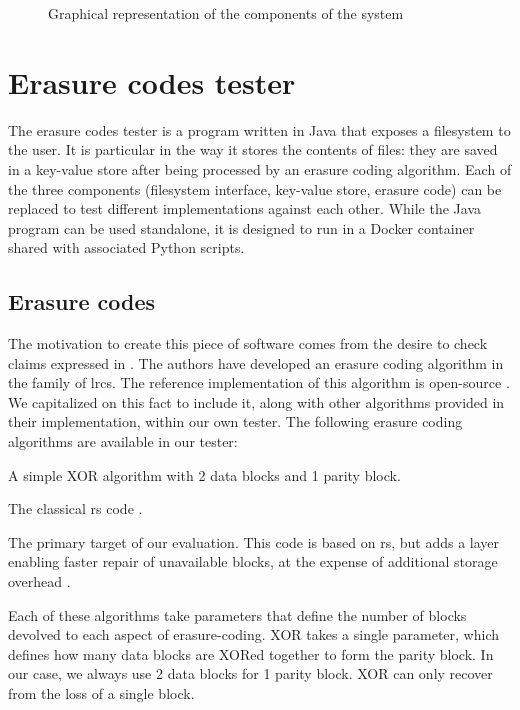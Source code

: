 \begin{figure}
    \centering
    
    \caption{Graphical representation of the components of the system}
    \label{fig:architecture}
\end{figure}

\section{Erasure codes tester}

The erasure codes tester is a program written in Java that exposes a filesystem to the user.
It is particular in the way it stores the contents of files: they are saved in a key-value store after being processed by an erasure coding algorithm.
Each of the three components (filesystem interface, key-value store, erasure code) can be replaced to test different implementations against each other.
While the Java program can be used standalone, it is designed to run in a Docker container shared with associated Python scripts.

\subsection{Erasure codes}

The motivation to create this piece of software comes from the desire to check claims expressed in  \autocite{XorbasVLDB}.
The authors have developed an erasure coding algorithm in the family of \acfp{lrc}.
The reference implementation of this algorithm is open-source \autocite{xorbas-github}.
We capitalized on this fact to include it, along with other algorithms provided in their implementation, within our own tester.
The following erasure coding algorithms are available in our tester:
\begin{description}
\item[XOR] A simple XOR algorithm with 2 data blocks and 1 parity block.
\item[\acs{rs}] The classical \acf{rs} code \autocite{reed-solomon}.
\item[\acs{lrc}] The primary target of our evaluation. This code is based on \ac{rs}, but adds a layer enabling faster repair of unavailable blocks, at the expense of additional storage overhead \autocite{XorbasVLDB}.
\end{description}

Each of these algorithms take parameters that define the number of blocks devolved to each aspect of erasure-coding.
XOR takes a single parameter, which defines how many data blocks are XORed together to form the parity block.
In our case, we always use 2 data blocks for 1 parity block.
XOR can only recover from the loss of a single block.

